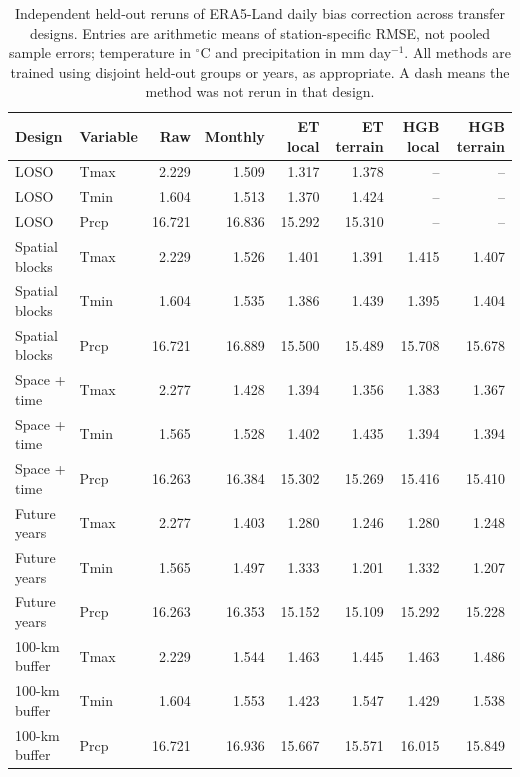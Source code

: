 \begin{table}[t]
\centering
\small
\caption{Independent held-out reruns of ERA5-Land daily bias correction across transfer designs. Entries are arithmetic means of station-specific RMSE, not pooled sample errors; temperature in $^\circ$C and precipitation in mm day$^{-1}$. All methods are trained using disjoint held-out groups or years, as appropriate. A dash means the method was not rerun in that design.}
\label{tab:independent_transfer_reruns}
\begin{tabular}{llrrrrrr}
\hline
Design & Variable & Raw & Monthly & ET local & ET terrain & HGB local & HGB terrain \\
\hline
LOSO & Tmax & 2.229 & 1.509 & 1.317 & 1.378 & -- & -- \\
LOSO & Tmin & 1.604 & 1.513 & 1.370 & 1.424 & -- & -- \\
LOSO & Prcp & 16.721 & 16.836 & 15.292 & 15.310 & -- & -- \\
Spatial blocks & Tmax & 2.229 & 1.526 & 1.401 & 1.391 & 1.415 & 1.407 \\
Spatial blocks & Tmin & 1.604 & 1.535 & 1.386 & 1.439 & 1.395 & 1.404 \\
Spatial blocks & Prcp & 16.721 & 16.889 & 15.500 & 15.489 & 15.708 & 15.678 \\
Space + time & Tmax & 2.277 & 1.428 & 1.394 & 1.356 & 1.383 & 1.367 \\
Space + time & Tmin & 1.565 & 1.528 & 1.402 & 1.435 & 1.394 & 1.394 \\
Space + time & Prcp & 16.263 & 16.384 & 15.302 & 15.269 & 15.416 & 15.410 \\
Future years & Tmax & 2.277 & 1.403 & 1.280 & 1.246 & 1.280 & 1.248 \\
Future years & Tmin & 1.565 & 1.497 & 1.333 & 1.201 & 1.332 & 1.207 \\
Future years & Prcp & 16.263 & 16.353 & 15.152 & 15.109 & 15.292 & 15.228 \\
100-km buffer & Tmax & 2.229 & 1.544 & 1.463 & 1.445 & 1.463 & 1.486 \\
100-km buffer & Tmin & 1.604 & 1.553 & 1.423 & 1.547 & 1.429 & 1.538 \\
100-km buffer & Prcp & 16.721 & 16.936 & 15.667 & 15.571 & 16.015 & 15.849 \\
\hline
\end{tabular}
\end{table}
